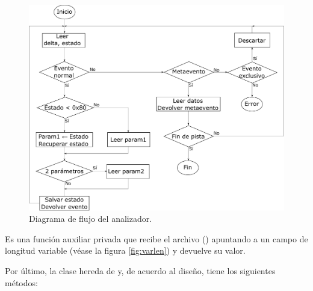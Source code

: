 \begin{description}[style=nextline]
	\begin{figure}[H]
		\noindent \begin{centering}
			\includegraphics[width=\linewidth*2/3]{capitulo5/flujo_parser}
			\par\end{centering}
		\smallskip
		\caption{\label{fig:flujo_parser} Diagrama de flujo del analizador.}
	\end{figure}
	
	\smallskip
	
	\item[\code{varlen(file)}]
	Es una función auxiliar privada que recibe el archivo () apuntando a un campo de longitud variable (véase la figura \ref{fig:varlen}) y devuelve su valor.
	
\end{description}

Por último, la clase  hereda de  y, de acuerdo al diseño, tiene los siguientes métodos:

